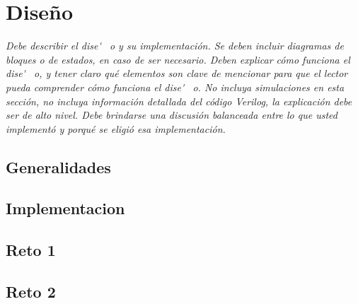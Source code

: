 \newpage
\section{Dise\~ no}
\textit{Debe describir el dise\' ~o y su implementaci\' on. Se deben incluir diagramas de bloques o de estados, en caso de ser necesario. Deben explicar c\' omo funciona el dise\' ~o, y tener claro qu\' e elementos son clave de mencionar para que el lector pueda comprender c\' omo funciona el dise\' ~o. No incluya simulaciones en esta secci\' on, no incluya informaci\' on detallada del c\' odigo Verilog, la explicaci\' on debe ser de alto nivel. Debe brindarse una discusi\' on balanceada entre lo que usted implement\' o y porqu\' e se eligi\' o esa implementaci\' on. }

\subsection{Generalidades}
\subsection{Implementacion}
\subsection{Reto 1}
\subsection{Reto 2}
